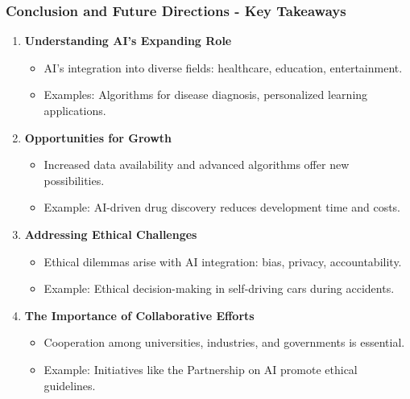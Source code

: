 \documentclass[aspectratio=169]{beamer}
\begin{document}
\begin{frame}[fragile]
    \frametitle{Conclusion and Future Directions - Key Takeaways}
    \begin{enumerate}
        \item \textbf{Understanding AI's Expanding Role}
        \begin{itemize}
            \item AI's integration into diverse fields: healthcare, education, entertainment.
            \item Examples: Algorithms for disease diagnosis, personalized learning applications.
        \end{itemize}
        
        \item \textbf{Opportunities for Growth}
        \begin{itemize}
            \item Increased data availability and advanced algorithms offer new possibilities.
            \item Example: AI-driven drug discovery reduces development time and costs.
        \end{itemize}
        
        \item \textbf{Addressing Ethical Challenges}
        \begin{itemize}
            \item Ethical dilemmas arise with AI integration: bias, privacy, accountability.
            \item Example: Ethical decision-making in self-driving cars during accidents.
        \end{itemize}
        
        \item \textbf{The Importance of Collaborative Efforts}
        \begin{itemize}
            \item Cooperation among universities, industries, and governments is essential.
            \item Example: Initiatives like the Partnership on AI promote ethical guidelines.
        \end{itemize}
    \end{enumerate}
\end{frame}
\end{document}
